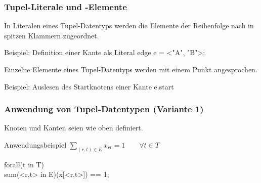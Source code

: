 \begin{frame}
 \frametitle{Tupel-Literale und -Elemente}
 In Literalen eines Tupel-Datentyps werden die Elemente der Reihenfolge nach in spitzen Klammern zugeordnet.
 \begin{block}{Beispiel: Definition einer Kante als Literal}
  \ttfamily
    edge e = <"A", "B">;
 \end{block}
 
 Einzelne Elemente eines Tupel-Datentyps werden mit einem Punkt angesprochen.
 \begin{block}{Beispiel: Auslesen des Startknotens einer Kante}
  {\ttfamily e.start} \qquad\textrightarrow{}
 \end{block}
\end{frame}

\begin{frame}
 \frametitle{Anwendung von Tupel-Datentypen (Variante 1)}
 Knoten und Kanten seien wie oben definiert.
 
 \begin{block}{Anwendungsbeispiel}
  $\displaystyle\sum_{(r, t)\in E} x_{rt} = 1  \qquad\forall t\in T$\\
  \begin{center}
  \end{center}
  {\ttfamily forall(\alert{t} in T)\\
  \quad sum(<r,\alert{t}> in E)(x[<r,t>]) == 1;}
 \end{block}
\end{frame}


